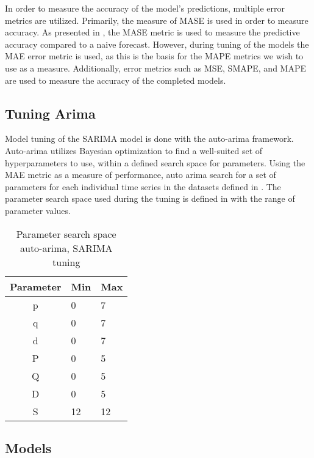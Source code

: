   In order to measure the accuracy of the model's predictions, multiple error metrics are utilized.
  Primarily, the measure of MASE is used in order to measure accuracy.
  As presented in , the MASE metric is used to measure the predictive accuracy
  compared to a naive forecast.
  However, during tuning of the models the MAE error metric is used, as this is the basis for the MAPE metrics we wish to use as a measure.
  Additionally, error metrics such as MSE, SMAPE, and MAPE are used to measure the accuracy of the completed models.

  \subsection{Tuning Arima}
  Model tuning of the SARIMA model is done with the auto-arima framework.
  Auto-arima utilizes Bayesian optimization to find a well-suited set of hyperparameters to use,
  within a defined search space for parameters.
  Using the MAE metric as a measure of performance, auto arima search for a set of parameters for each individual time series
  in the datasets defined in .
  The parameter search space used during the tuning is defined in  with the range of parameter values.

  \begin{table}[h]
    \centering
    \caption{Parameter search space auto-arima, SARIMA tuning}
    \label{table:method:arima-tuning}
    \begin{tabular}{|c|l|l|}\hline
      Parameter & Min & Max \\ \hline
      p         & 0   & 7   \\ \hline
      q         & 0   & 7   \\ \hline
      d         & 0   & 7   \\ \hline
      P         & 0   & 5   \\ \hline
      Q         & 0   & 5   \\ \hline
      D         & 0   & 5   \\ \hline
      S         & 12  & 12  \\ \hline
    \end{tabular}
  \end{table}


  \subsection{Models}

